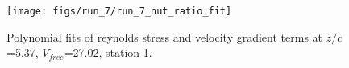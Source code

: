 \begin{figure}[H]
\centering
\texttt{[image: figs/run\_7/run\_7\_nut\_ratio\_fit]}
\caption{Polynomial fits of reynolds stress and velocity gradient terms at $z/c$=5.37, $V_{free}$=27.02, station 1.}
\label{fig:run_7_nut_ratio_fit}
\end{figure}


